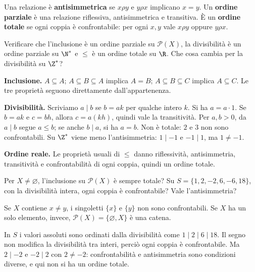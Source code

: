 \begin{definizione}
Una relazione è \textbf{antisimmetrica} se $x\rho y$ e $y\rho x$ implicano $x=y$. Un \textbf{ordine parziale} è una relazione riflessiva, antisimmetrica e transitiva. È un \textbf{ordine totale} se ogni coppia è confrontabile: per ogni $x,y$ vale $x\rho y$ oppure $y\rho x$.
\end{definizione}

\begin{esercizio}
Verificare che l'inclusione è un ordine parziale su $\mathcal P(X)$, la divisibilità è un ordine parziale su $\N^*$ e $\le$ è un ordine totale su $\R$. Che cosa cambia per la divisibilità su $\Z^*$?
\end{esercizio}
\begin{svolgimento}
\textbf{Inclusione.} $A\subseteq A$; $A\subseteq B\subseteq A$ implica $A=B$; $A\subseteq B\subseteq C$ implica $A\subseteq C$. Le tre proprietà seguono direttamente dall'appartenenza.

\textbf{Divisibilità.} Scriviamo $a\mid b$ se $b=ak$ per qualche intero $k$. Si ha $a=a\cdot1$. Se $b=ak$ e $c=bh$, allora $c=a(kh)$, quindi vale la transitività. Per $a,b>0$, da $a\mid b$ segue $a\le b$; se anche $b\mid a$, si ha $a=b$. Non è totale: $2$ e $3$ non sono confrontabili. Su $\Z^*$ viene meno l'antisimmetria: $1\mid-1$ e $-1\mid1$, ma $1\ne-1$.

\textbf{Ordine reale.} Le proprietà usuali di $\le$ danno riflessività, antisimmetria, transitività e confrontabilità di ogni coppia, quindi un ordine totale.
\end{svolgimento}

\begin{esercizio}[Confrontabilità]
Per $X\ne\varnothing$, l'inclusione su $\mathcal P(X)$ è sempre totale? Su $S=\{1,2,-2,6,-6,18\}$, con la divisibilità intera, ogni coppia è confrontabile? Vale l'antisimmetria?
\end{esercizio}
\begin{svolgimento}
Se $X$ contiene $x\ne y$, i singoletti $\{x\}$ e $\{y\}$ non sono confrontabili. Se $X$ ha un solo elemento, invece, $\mathcal P(X)=\{\varnothing,X\}$ è una catena.

In $S$ i valori assoluti sono ordinati dalla divisibilità come $1\mid2\mid6\mid18$. Il segno non modifica la divisibilità tra interi, perciò ogni coppia è confrontabile. Ma $2\mid-2$ e $-2\mid2$ con $2\ne-2$: confrontabilità e antisimmetria sono condizioni diverse, e qui non si ha un ordine totale.
\end{svolgimento}

